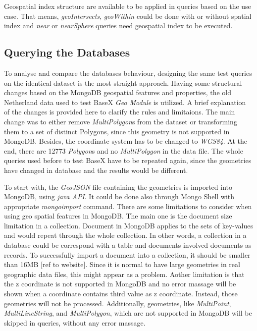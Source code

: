 \documentclass[a4paper,12pt]{article}
\begin{document}
 
Geospatial index structure are available to be applied in queries based on the use case. That means, \textit{geoIntersects}, \textit{geoWithin} could be done with or without spatial index and \textit{near} or \textit{nearSphere} queries need geospatial index to be executed.

\subsection{Querying the Databases}

To analyse and compare the databases behaviour, designing the same test queries on the identical dataset is the most straight approach. Having some structural changes based on the MongoDB geospatial features and properties, the old Netherland data used to test BaseX \textit{Geo Module} is utilized. A brief explanation of the changes is provided here to clarify the rules and limitaions. The main change was to either remove \textit{MultiPolygon}s from the dataset or transforming them to a set of distinct Polygons, since this geometry is not supported in MongoDB. Besides, the coordinate system has to be changed to \textit{WGS84}. At the end, there are 12773 \textit{Polygon}s and no \textit{MultiPolygon} in the data file. The whole queries used before to test BaseX have to be repeated again, since the geometries have changed in database and the results would be different. 

To start with, the \textit{GeoJSON} file containing the geometries is imported into MongoDB, using \textit{java API}. It could be done also through Mongo Shell with appropriate \textit{mongoimport} command. There are some limitations to consider when using geo spatial features in MongoDB. The main one is the document size limitation in a collection. Document in MongoDB applies to the sets of key-values and would repeat through the whole collection. In other words, a collection in a database could be correspond with a table and documents involved documents as records. To successfully import a document into a collection, it  should be smaller than 16MB [ref to website]. Since it is normal to have large geometries in real geographic data files, this might appear as a problem. Aother limitation is that the z coordinate is not supported in MongoDB and no error massage will be shown when a coordinate contains third value as z coordinate. Instead, those geometries will not be processed. Additionally, geometries, like \textit{MultiPoint}, \textit{MultiLineString}, and \textit{MultiPolygon}, which are not supported in MongoDB  will be skipped in queries, without any error massage. 
\end{document}
